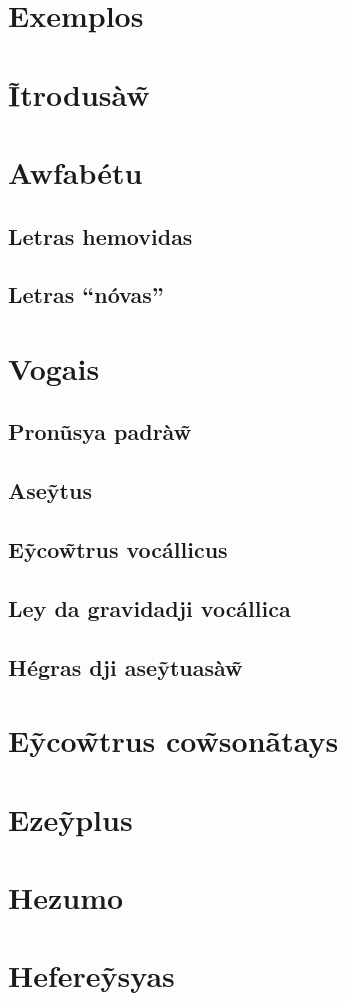 \documentclass[12pt, a4paper]{article}
\begin{document}
\begin{bilingualpages}
    \section{Exemplos}
    
    \leftpage
    \section{Ĩtrodusà\~{w}}
    
    \newpage
    \section{Awfabétu}
    \AbcBrbr
    \subsection{Letras hemovidas}
    \subsection{Letras ``nóvas''}
    
    \section{Vogais}
    \subsection{Pronũsya padrà\~w}
    \subsection{Ase\~ytus}
    \subsection{E\~yco\~wtrus vocállicus}
    \subsection{Ley da gravidadji vocállica}
    \subsection{Hégras dji ase\~ytuasà\~w}

    \section{E\~yco\~wtrus co\~wsonãtays}

    \section{Eze\~yplus}
    
\end{bilingualpages}

\newpage
\section{Hezumo}
\AbcBrBrSquare

\newpage
\section{Hefere\~ysyas}
\end{document}
